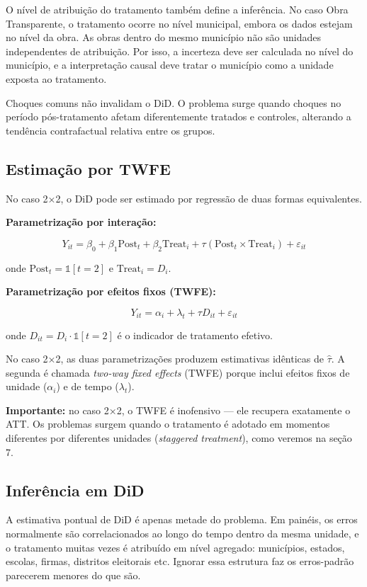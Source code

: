 \documentclass[
]{article}
\begin{document}
O nível de atribuição do tratamento também define a inferência. No caso Obra Transparente, o tratamento ocorre no nível municipal, embora os dados estejam no nível da obra. As obras dentro do mesmo município não são unidades independentes de atribuição. Por isso, a incerteza deve ser calculada no nível do município, e a interpretação causal deve tratar o município como a unidade exposta ao tratamento.

Choques comuns não invalidam o DiD. O problema surge quando choques no período pós-tratamento afetam diferentemente tratados e controles, alterando a tendência contrafactual relativa entre os grupos.

\subsection{Estimação por TWFE}\label{estimauxe7uxe3o-por-twfe}

No caso 2×2, o DiD pode ser estimado por regressão de duas formas equivalentes.

\textbf{Parametrização por interação:}

\[
Y_{it} = \beta_0 + \beta_1 \text{Post}_t + \beta_2 \text{Treat}_i + \tau (\text{Post}_t \times \text{Treat}_i) + \varepsilon_{it}
\]

onde \(\text{Post}_t = \mathbb{1}[t = 2]\) e \(\text{Treat}_i = D_i\).

\textbf{Parametrização por efeitos fixos (TWFE):}

\[
Y_{it} = \alpha_i + \lambda_t + \tau D_{it} + \varepsilon_{it}
\]

onde \(D_{it} = D_i \cdot \mathbb{1}[t = 2]\) é o indicador de tratamento efetivo.

No caso 2×2, as duas parametrizações produzem estimativas idênticas de \(\hat{\tau}\). A segunda é chamada \emph{two-way fixed effects} (TWFE) porque inclui efeitos fixos de unidade (\(\alpha_i\)) e de tempo (\(\lambda_t\)).

\textbf{Importante:} no caso 2×2, o TWFE é inofensivo --- ele recupera exatamente o ATT. Os problemas surgem quando o tratamento é adotado em momentos diferentes por diferentes unidades (\emph{staggered treatment}), como veremos na seção 7.

\subsection{Inferência em DiD}\label{inferuxeancia-em-did}

A estimativa pontual de DiD é apenas metade do problema. Em painéis, os erros normalmente são correlacionados ao longo do tempo dentro da mesma unidade, e o tratamento muitas vezes é atribuído em nível agregado: municípios, estados, escolas, firmas, distritos eleitorais etc. Ignorar essa estrutura faz os erros-padrão parecerem menores do que são.
\end{document}

